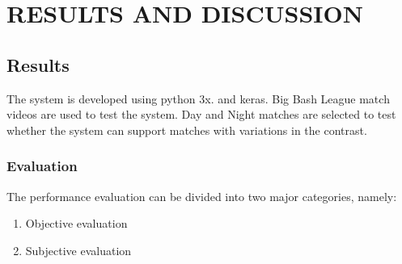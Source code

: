 
\chapter{RESULTS AND DISCUSSION} %

\section{Results}
The system is developed using python 3x. and keras. Big Bash League match videos are used to test the system. Day and Night matches are selected to test whether the system can support matches with variations in the contrast.
\subsection{Evaluation}
	The performance evaluation can be divided into two major categories, namely:
\begin{enumerate}[I]
    \item Objective evaluation
    \item Subjective evaluation
\end{enumerate}


